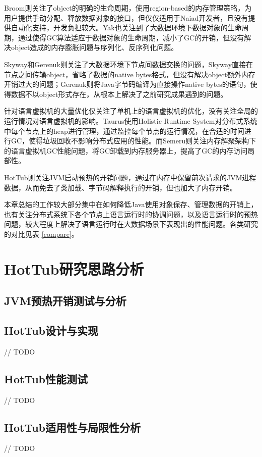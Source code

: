 \documentclass[lang=cn,12pt,a4paper,cite=authoryear]{elegantpaper}
\begin{document}


Broom则关注了object的明确的生命周期，使用region-based的内存管理策略，为用户提供手动分配、释放数据对象的接口，但仅仅适用于Naiad开发者，且没有提供自动化支持，开发负担较大。Yak\cite{DBLP:conf/osdi/NguyenFXDLAM16}也关注到了大数据环境下数据对象的生命周期，通过使得GC算法适应于数据对象的生命周期，减小了GC的开销，但没有解决object造成的内存膨胀问题与序列化、反序列化问题。

Skyway和Gerenuk则关注了大数据环境下节点间数据交换的问题，Skyway直接在节点之间传输object，省略了数据的native bytes格式，但没有解决object额外内存开销过大的问题；Gerenuk则将Java字节码编译为直接操作native bytes的语句，使得数据不以object形式存在，从根本上解决了之前研究成果遇到的问题。

针对语言虚拟机的大量优化仅关注了单机上的语言虚拟机的优化，没有关注全局的运行情况对语言虚拟机的影响。Taurus使用Holistic Runtime System对分布式系统中每个节点上的heap进行管理，通过监控每个节点的运行情况，在合适的时间进行GC，使得垃圾回收不影响分布式应用的性能。而Semeru则关注内存解聚架构下的语言虚拟机GC性能问题，将GC卸载到内存服务器上，提高了GC的内存访问局部性。

HotTub则关注JVM启动预热的开销问题，通过在内存中保留前次请求的JVM进程数据，从而免去了类加载、字节码解释执行的开销，但也加大了内存开销。

本章总结的工作较大部分集中在如何降低Java使用对象保存、管理数据的开销上，也有关注分布式系统下各个节点上语言运行时的协调问题，以及语言运行时的预热问题，较大程度上解决了语言运行时在大数据场景下表现出的性能问题。各类研究的对比见表 \ref{compare}。

\section{HotTub研究思路分析}
\subsection{JVM预热开销测试与分析}

\subsection{HotTub设计与实现}
// TODO
\subsection{HotTub性能测试}
// TODO
\subsection{HotTub适用性与局限性分析}
// TODO
\end{document}
